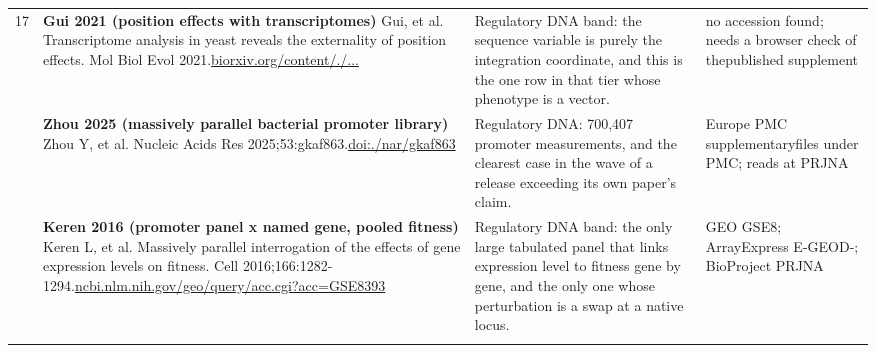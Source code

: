 \begin{landscape}
\begin{longtable}{@{}r@{\hspace{4pt}} L{78mm} L{72mm} L{76mm}@{}}
17 & \textbf{Gui 2021 (position effects with transcriptomes)} \newline Gui, et al. Transcriptome analysis in yeast reveals the externality of position effects. Mol Biol Evol 2021.\newline \href{https://www.biorxiv.org/content/10.1101/2020.04.02.021162}{biorxiv.\allowbreak org/\allowbreak content\allowbreak /./...} & Regulatory DNA band: the sequence variable is purely the integration coordinate, and this is the one row in that tier whose phenotype is a vector. & no acces\allowbreak sion fou\allowbreak nd; need\allowbreak s a brow\allowbreak ser chec\allowbreak k of the\allowbreak  publish\allowbreak ed suppl\allowbreak ement \\
 & \textbf{Zhou 2025 (massively parallel bacterial promoter library)} \newline Zhou Y, et al. Nucleic Acids Res 2025;53:gkaf863.\newline \href{https://doi.org/10.1093/nar/gkaf863}{doi:./\allowbreak nar/\allowbreak gkaf863} & Regulatory DNA: 700,407 promoter measurements, and the clearest case in the wave of a release exceeding its own paper's claim. & Europe P\allowbreak MC suppl\allowbreak ementary\allowbreak  files u\allowbreak nder PMC\allowbreak ; reads \allowbreak at PRJNA \\
 & \textbf{Keren 2016 (promoter panel x named gene, pooled fitness)} \newline Keren L, et al. Massively parallel interrogation of the effects of gene expression levels on fitness. Cell 2016;166:1282-1294.\newline \href{https://www.ncbi.nlm.nih.gov/geo/query/acc.cgi?acc=GSE83936}{ncbi.\allowbreak nlm.\allowbreak nih.\allowbreak gov/\allowbreak geo/\allowbreak query/\allowbreak acc.\allowbreak cgi?\allowbreak acc=\allowbreak GSE8393} & Regulatory DNA band: the only large tabulated panel that links expression level to fitness gene by gene, and the only one whose perturbation is a swap at a native locus. & GEO GSE8; Ar\allowbreak rayExpre\allowbreak ss E-\allowbreak GEOD-; \allowbreak BioProje\allowbreak ct PRJNA \\
\addlinespace[5pt]

\end{longtable}
\end{landscape}
